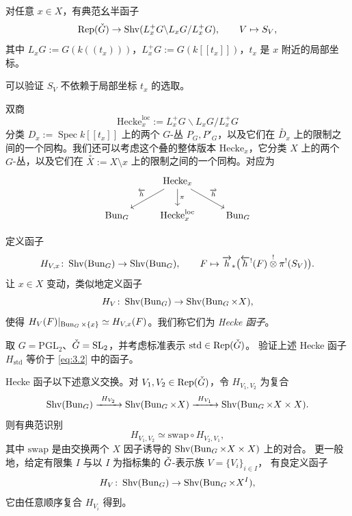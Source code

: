 \begin{theorem}[几何 Satake]\label{thm:satake}
对任意 \(x\in X\)，有典范幺半函子
\[
\operatorname{Rep}(\check{G})\to\operatorname{Shv}(L^+_xG\backslash L_xG/L^+_xG),\qquad V\mapsto S_V,
\]
其中 \(L_xG:=G(k((t_x)))\)，\(L^+_xG:=G(k[[t_x]])\)，\(t_x\) 是 \(x\) 附近的局部坐标。
\end{theorem}

\begin{remark}\label{rem:satake-indep}
可以验证 \(S_V\) 不依赖于局部坐标 \(t_x\) 的选取。
\end{remark}

双商
\[
\mathrm{Hecke}^{\mathrm{loc}}_x:=L^+_xG\backslash L_xG/L^+_xG
\]
分类 \(D_x:=\operatorname{Spec} k[[t_x]]\) 上的两个 \(G\)-丛 \(P_G,P'_G\)，以及它们在
\(\overset{\circ}{D}_x\) 上的限制之间的一个同构。我们还可以考虑这个叠的整体版本
\(\mathrm{Hecke}_x\)，它分类 \(X\) 上的两个 \(G\)-丛，以及它们在
\(\overset{\circ}{X}:=X\setminus x\) 上的限制之间的一个同构。对应为
\[
\begin{tikzcd}
& \mathrm{Hecke}_x \arrow[dl,"\overleftarrow{h}"'] \arrow[dr,"\overrightarrow{h}"] \arrow[d,"\pi"] & \\
\Bun_G & \mathrm{Hecke}^{\mathrm{loc}}_x & \Bun_G
\end{tikzcd}
\]

\begin{definition}\label{def:hecke-functor}
定义函子
\[
H_{V,x}\colon\operatorname{Shv}(\operatorname{Bun}_G)\to\operatorname{Shv}(\operatorname{Bun}_G),\qquad
F\mapsto\overrightarrow{h}_*\bigl(\overleftarrow{h}^!(F)\overset{!}{\otimes}\pi^!(S_V)\bigr).
\]
让 \(x\in X\) 变动，类似地定义函子
\[
H_V\colon\operatorname{Shv}(\operatorname{Bun}_G)\to\operatorname{Shv}(\operatorname{Bun}_G\times X),
\]
使得 \(H_V(F)|_{\operatorname{Bun}_G\times\{x\}}\simeq H_{V,x}(F)\)。我们称它们为 \emph{Hecke 函子}。
\end{definition}

\begin{exercise}\label{ex:hecke-pgl2}
取 \(G=\mathrm{PGL}_2\)、\(\check{G}=\mathrm{SL}_2\)，并考虑标准表示 \(\mathrm{std}\in\operatorname{Rep}(\check{G})\)。
验证上述 Hecke 函子 \(H_{\mathrm{std}}\) 等价于 \eqref{eq:3.2} 中的函子。
\end{exercise}

Hecke 函子以下述意义交换。对 \(V_1,V_2\in\operatorname{Rep}(\check{G})\)，令 \(H_{V_1,V_2}\) 为复合
\[
\Shv(\Bun_G)\xrightarrow{\ H_{V_2}\ }\Shv(\Bun_G\times X)
\xrightarrow{\ H_{V_1}\ }\Shv(\Bun_G\times X\times X).
\]
则有典范识别
\[
H_{V_1,V_2}\simeq\mathrm{swap}\circ H_{V_2,V_1},
\]
其中 \(\mathrm{swap}\) 是由交换两个 \(X\) 因子诱导的 \(\operatorname{Shv}(\operatorname{Bun}_G\times X\times X)\) 上的对合。
更一般地，给定有限集 \(I\) 与以 \(I\) 为指标集的 \(\check{G}\)-表示族 \(V=\{V_i\}_{i\in I}\)，
有良定义函子
\[
H_V\colon\operatorname{Shv}(\operatorname{Bun}_G)\to\operatorname{Shv}(\operatorname{Bun}_G\times X^I),
\]
它由任意顺序复合 \(H_{V_i}\) 得到。

